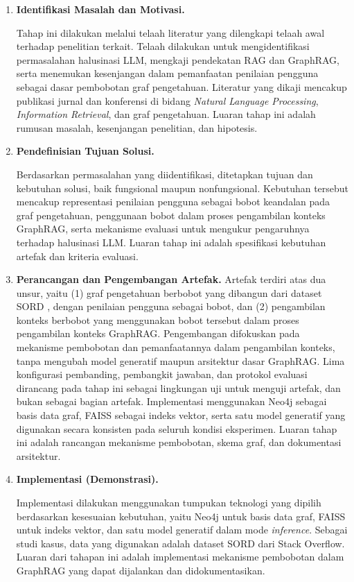 \begin{enumerate}
    \item \textbf{Identifikasi Masalah dan Motivasi.}
    
    Tahap ini dilakukan melalui telaah literatur yang dilengkapi telaah awal terhadap penelitian terkait. Telaah dilakukan untuk mengidentifikasi permasalahan halusinasi LLM, mengkaji pendekatan RAG dan GraphRAG, serta menemukan kesenjangan dalam pemanfaatan penilaian pengguna sebagai dasar pembobotan graf pengetahuan. Literatur yang dikaji mencakup publikasi jurnal dan konferensi di bidang \emph{Natural Language Processing}, \emph{Information Retrieval}, dan graf pengetahuan. Luaran tahap ini adalah rumusan masalah, kesenjangan penelitian, dan hipotesis.

    \item \textbf{Pendefinisian Tujuan Solusi.}

    Berdasarkan permasalahan yang diidentifikasi, ditetapkan tujuan dan kebutuhan solusi, baik fungsional maupun nonfungsional. Kebutuhan tersebut mencakup representasi penilaian pengguna sebagai bobot keandalan pada graf pengetahuan, penggunaan bobot dalam proses pengambilan konteks GraphRAG, serta mekanisme evaluasi untuk mengukur pengaruhnya terhadap halusinasi LLM. Luaran tahap ini adalah spesifikasi kebutuhan artefak dan kriteria evaluasi.

    \item \textbf{Perancangan dan Pengembangan Artefak.}
    Artefak terdiri atas dua unsur, yaitu (1) graf pengetahuan berbobot yang dibangun dari dataset SORD \autocite{Fatima2026}, dengan penilaian pengguna sebagai bobot, dan (2) pengambilan konteks berbobot yang menggunakan bobot tersebut dalam proses pengambilan konteks GraphRAG. Pengembangan difokuskan pada mekanisme pembobotan dan pemanfaatannya dalam pengambilan konteks, tanpa mengubah model generatif maupun arsitektur dasar GraphRAG. Lima konfigurasi pembanding, pembangkit jawaban, dan protokol evaluasi dirancang pada tahap ini sebagai lingkungan uji untuk menguji artefak, dan bukan sebagai bagian artefak. Implementasi menggunakan Neo4j sebagai basis data graf, FAISS sebagai indeks vektor, serta satu model generatif yang digunakan secara konsisten pada seluruh kondisi eksperimen. Luaran tahap ini adalah rancangan mekanisme pembobotan, skema graf, dan dokumentasi arsitektur.
    
    \item \textbf{Implementasi (Demonstrasi).}

     Implementasi dilakukan menggunakan tumpukan teknologi yang dipilih berdasarkan kesesuaian kebutuhan, yaitu Neo4j untuk basis data graf, FAISS untuk indeks vektor, dan satu model generatif dalam mode \emph{inference}. Sebagai studi kasus, data yang digunakan adalah dataset SORD \autocite{Fatima2026} dari Stack Overflow. Luaran dari tahapan ini adalah implementasi mekanisme pembobotan dalam GraphRAG yang dapat dijalankan dan didokumentasikan.


\end{enumerate}
